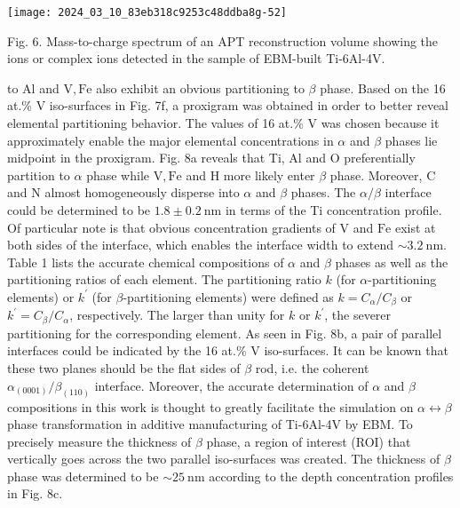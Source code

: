 \documentclass[10pt]{article}
\begin{document}
\begin{center}
\texttt{[image: 2024\_03\_10\_83eb318c9253c48ddba8g-52]}
\end{center}

Fig. 6. Mass-to-charge spectrum of an APT reconstruction volume showing the ions or complex ions detected in the sample of EBM-built Ti-6Al-4V.

to $\mathrm{Al}$ and $\mathrm{V}, \mathrm{Fe}$ also exhibit an obvious partitioning to $\beta$ phase. Based on the 16 at.\% V iso-surfaces in Fig. 7f, a proxigram was obtained in order to better reveal elemental partitioning behavior. The values of 16 at.\% V was chosen because it approximately enable the major elemental concentrations in $\alpha$ and $\beta$ phases lie midpoint in the proxigram. Fig. 8a reveals that Ti, $\mathrm{Al}$ and $\mathrm{O}$ preferentially partition to $\alpha$ phase while $\mathrm{V}, \mathrm{Fe}$ and $\mathrm{H}$ more likely enter $\beta$ phase. Moreover, $\mathrm{C}$ and $\mathrm{N}$ almost homogeneously disperse into $\alpha$ and $\beta$ phases. The $\alpha / \beta$ interface could be determined to be $1.8 \pm 0.2 \mathrm{~nm}$ in terms of the Ti concentration profile. Of particular note is that obvious concentration gradients of $\mathrm{V}$ and $\mathrm{Fe}$ exist at both sides of the interface, which enables the interface width to extend $\sim 3.2 \mathrm{~nm}$. Table 1 lists the accurate chemical compositions of $\alpha$ and $\beta$ phases as well as the partitioning ratios of each element. The partitioning ratio $k$ (for $\alpha$-partitioning elements) or $k^{\prime}$ (for $\beta$-partitioning elements) were defined as $k=C_{\alpha} / C_{\beta}$ or $k^{\prime}=C_{\beta} / C_{\alpha}$, respectively. The larger than unity for $k$ or $k^{\prime}$, the severer partitioning for the corresponding element. As seen in Fig. 8b, a pair of parallel interfaces could be indicated by the 16 at.\% V iso-surfaces. It can be known that these two planes should be the flat sides of $\beta$ rod, i.e. the coherent $\alpha_{(0001)} / \beta_{(110)}$ interface. Moreover, the accurate determination of $\alpha$ and $\beta$ compositions in this work is thought to greatly facilitate the simulation on $\alpha \leftrightarrow \beta$ phase transformation in additive manufacturing of Ti-6Al-4V by EBM. To precisely measure the thickness of $\beta$ phase, a region of interest (ROI) that vertically goes across the two parallel iso-surfaces was created. The thickness of $\beta$ phase was determined to be $\sim 25 \mathrm{~nm}$ according to the depth concentration profiles in Fig. $8 \mathrm{c}$.
\end{document}

